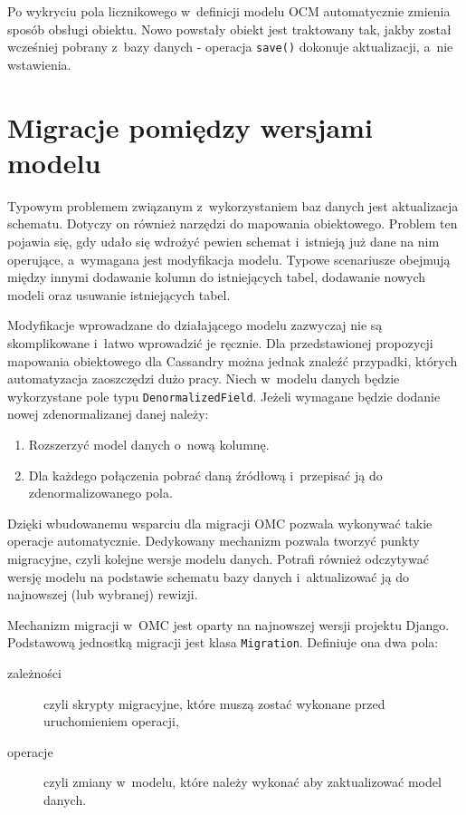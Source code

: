 Po wykryciu pola licznikowego w~definicji modelu OCM automatycznie zmienia sposób obsługi obiektu. Nowo powstały obiekt jest traktowany tak, jakby został wcześniej pobrany z~bazy danych - operacja \verb+save()+ dokonuje aktualizacji, a~nie wstawienia. 

\section{Migracje pomiędzy wersjami modelu}
\label{sec:ocm_migrations}

Typowym problemem związanym z~wykorzystaniem baz danych jest aktualizacja schematu. Dotyczy on również narzędzi do mapowania obiektowego. Problem ten pojawia się, gdy udało się wdrożyć pewien schemat i~istnieją już dane na nim operujące, a~wymagana jest modyfikacja modelu. Typowe scenariusze obejmują między innymi dodawanie kolumn do istniejących tabel, dodawanie nowych modeli oraz usuwanie istniejących tabel. 

Modyfikacje wprowadzane do działającego modelu zazwyczaj nie są skomplikowane i~łatwo wprowadzić je ręcznie. Dla przedstawionej propozycji mapowania obiektowego dla Cassandry można jednak znaleźć przypadki, których automatyzacja zaoszczędzi dużo pracy. Niech w~modelu danych będzie wykorzystane pole typu \verb+DenormalizedField+. Jeżeli wymagane będzie dodanie nowej zdenormalizanej danej należy:

\begin{enumerate}
	\item Rozszerzyć model danych o~nową kolumnę.
	\item Dla każdego połączenia pobrać daną źródłową i~przepisać ją do zdenormalizowanego pola.
\end{enumerate}

Dzięki wbudowanemu wsparciu dla migracji OMC pozwala wykonywać takie operacje automatycznie. Dedykowany mechanizm pozwala tworzyć punkty migracyjne, czyli kolejne wersje modelu danych. Potrafi również odczytywać wersję modelu na podstawie schematu bazy danych i~aktualizować ją do najnowszej (lub wybranej) rewizji.

Mechanizm migracji w~OMC jest oparty na najnowszej wersji projektu Django.~\cite{django_migrations} Podstawową jednostką migracji jest klasa \verb+Migration+. Definiuje ona dwa pola:

\begin{description}
	\item[zależności] czyli skrypty migracyjne, które muszą zostać wykonane przed uruchomieniem operacji,
	\item[operacje] czyli zmiany w~modelu, które należy wykonać aby zaktualizować model danych.
\end{description}

